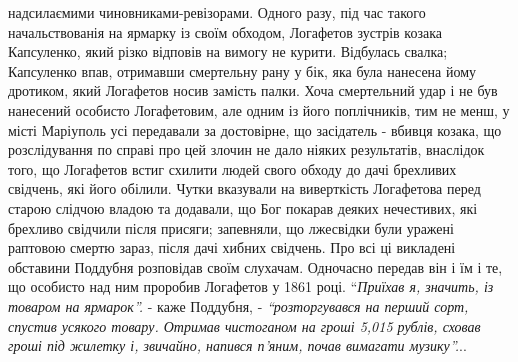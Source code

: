 \documentclass[a4paper,20pt]{report}
\begin{document}
надсилаємими чиновниками-ревізорами.
Одного разу, під час такого начальствованія на ярмарку із своїм обходом, Логафетов
зустрів козака Капсуленко, який різко відповів на вимогу не курити. Відбулась свалка; 
Капсуленко впав, отримавши смертельну рану у бік, яка була нанесена йому дротиком, який
Логафетов носив замість палки. Хоча смертельний удар і не був нанесений особисто
Логафетовим, але одним із його поплічників, тим не менш, у місті Маріуполь усі передавали
за достовірне, що засідатель - вбивця козака, що розслідування по справі про цей злочин
не дало ніяких результатів, внаслідок того, що Логафетов встиг схилити людей свого обходу до дачі
брехливих свідчень, які його обілили. Чутки вказували на виверткість Логафетова перед старою слідчою
владою та додавали, що Бог покарав деяких нечестивих, які брехливо свідчили після присяги; запевняли, що
лжесвідки були уражені раптовою смертю зараз, після дачі хибних свідчень. 
Про всі ці викладені обставини Поддубня розповідав своїм слухачам. Одночасно
передав він і їм і те, що особисто над ним проробив Логафетов у 1861 році. ``\emph{Приїхав
я, значить, із товаром на ярмарок''.} - каже Поддубня, - \emph{``розторгувався на перший сорт, спустив усякого
товару. Отримав чистоганом на гроші 5,015 рублів, сховав гроші під жилетку і, звичайно, напився п'яним, почав 
вимагати музику''.}..
\end{document}
